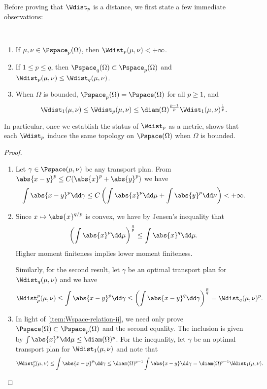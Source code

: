 \documentclass[oneside,reqno,letterpaper]{amsart}
\begin{document}
Before proving that \(\Wdist_p\) is a distance, we first state a few immediate observations:
\begin{proposition}\label{prop:Wdist-top-equiv}~
  \begin{enumerate}[label=(\roman*)]
    \item If \(\mu, \nu \in \Pspace_p(\Omega)\), then \(\Wdist_p(\mu, \nu) < +\infty\).
    \item\label{item:Wspace-relation-ii} If \(1 \leq p \leq q\), then \(\Pspace_q(\Omega) \subset \Pspace_p(\Omega)\) and \(\Wdist_p(\mu, \nu) \leq \Wdist_q(\mu, \nu)\).
    \item\label{item:Wspace-relation-iii} When \(\Omega\) is bounded, \(\Pspace_p(\Omega) = \Pspace(\Omega)\) for all \(p \geq 1\), and
      \[
        \Wdist_1(\mu, \nu) \leq \Wdist_p(\mu, \nu) \leq \diam(\Omega)^{\frac{p - 1}{p}} \Wdist_1(\mu, \nu)^{\frac{1}{p}}.
      \]
  \end{enumerate}
\end{proposition}
\begin{remark}
  In particular, once we establish the status of \(\Wdist_p\) as a metric,  shows that each \(\Wdist_p\) induce the same topology on \(\Pspace(\Omega)\) when \(\Omega\) is bounded.
\end{remark}
\begin{proof}~
  \begin{enumerate}[label=(\roman*)]
    \item Let \(\gamma \in \Pspace(\mu, \nu)\) be any transport plan.
      From \(\abs{x - y}^p \leq C (\abs{x}^p + \abs{y}^p)\) we have
      \[
        \int \abs{x - y}^p \dd \gamma
        \leq C \left( \int \abs{x}^p \dd \mu + \int \abs{y}^p \dd \nu \right)
        < +\infty.
      \]
      \item Since \(x \mapsto \abs{x}^{q / p}\) is convex, we have by Jensen's inequality that
        \[
          \left( \int \abs{x}^p \dd \mu \right)^{\frac{q}{p}}
          \leq \int \abs{x}^q \dd \mu.
        \]
        Higher moment finiteness implies lower moment finiteness.

        Similarly, for the second result, let \(\gamma\) be an optimal transport plan for \(\Wdist_q(\mu, \nu)\) and we have
        \[
          \Wdist_p^p(\mu, \nu)
          \leq \int \abs{x - y}^p \dd \gamma
          \leq \left( \int \abs{x - y}^q \dd \gamma \right)^{\frac{p}{q}}
          = \Wdist_q(\mu, \nu)^p.
        \]
      \item
        In light of \ref{item:Wspace-relation-ii}, we need only prove \(\Pspace(\Omega) \subset \Pspace_p(\Omega)\) and the second equality.
        The inclusion is given by \(\int \abs{x}^p \dd \mu \leq \diam(\Omega)^p\).
        For the inequality, let \(\gamma\) be an optimal transport plan for \(\Wdist_1(\mu, \nu)\) and note that
        \[
          \Wdist_p^p(\mu, \nu)
          \leq \int \abs{x - y}^p \dd \gamma
          \leq \diam(\Omega)^{p - 1} \int \abs{x - y} \dd \gamma
          = \diam(\Omega)^{p - 1} \Wdist_1(\mu, \nu).
        \]
  \end{enumerate}
\end{proof}
\end{document}
